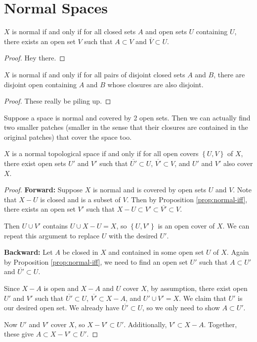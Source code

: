 \documentclass[10pt]{report}
\begin{document}

\section{Normal Spaces}

\begin{prop}
	\label{prop:normal-iff}
	$X$ is normal if and only if for all closed sets $A$ and open sets $U$ containing $U$, there exists an open set $V$ such that $A \subset V$ and $\overline{V}\subset U$.
\end{prop}
\begin{proof}
{\color{red}Hey there.}
\end{proof}

\begin{prop}
$X$ is normal if and only if for all pairs of disjoint closed sets $A$ and $B$, there are disjoint open containing $A$ and $B$ whose closures are also disjoint.
\end{prop}
\begin{proof}
{\color{red}These really be piling up.}
\end{proof}

Suppose a space is normal and covered by 2 open sets. Then we can actually find two smaller patches (smaller in the sense that their closures are contained in the original patches) that cover the space too.

\begin{thrm}
$X$ is a normal topological space if and only if for all open covers $\left\{ U,V \right\}$ of $X$, there exist open sets $U'$ and $V'$ such that $\overline{U'} \subset U$, $\overline{V'} \subset V$, and $U'$ and $V'$ also cover $X$.
\end{thrm}
\begin{proof}
	\textbf{Forward:} Suppose $X$ is normal and is covered by open sets $U$ and $V$. Note that $X-U$ is closed and is a subset of $V$. Then by Proposition \ref{prop:normal-iff}, there exists an open set $V'$ such that $X-U \subset V' \subset \overline{V'} \subset V.$

	Then $U \cup V'$ contains $U \cup X-U = X$, so $\left\{ U,V' \right\}$ is an open cover of $X$. We can repeat this argument to replace $U$ with the desired $U'$.

	\textbf{Backward:} Let $A$ be closed in $X$ and contained in some open set $U$ of $X$. Again by Proposition \ref{prop:normal-iff}, we need to find an open set $U'$ such that $A \subset U'$ and $\overline{U'} \subset U$.

	Since $X-A$ is open and $X-A$ and $U$ cover $X$, by assumption, there exist open $U'$ and $V'$ such that $\overline{U'} \subset U$, $\overline{V'} \subset X-A$, and $U' \cup V' = X$. We claim that $U'$ is our desired open set. We already have $\overline{U'}  \subset U$, so we only need to show $A \subset U'$.

	Now $U'$ and $V'$ cover $X$, so $X-V' \subset U'$. Additionally, $V' \subset X-A$. Together, these give $A \subset X-V' \subset U'$.
\end{proof}
\end{document}
